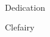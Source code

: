 
\renewcommand{\baselinestretch}{2}
\small\normalsize
\hbox{\ }
 
\vspace{-.65in}

\begin{center}
\large{Dedication}
\end{center} 

Clefairy
